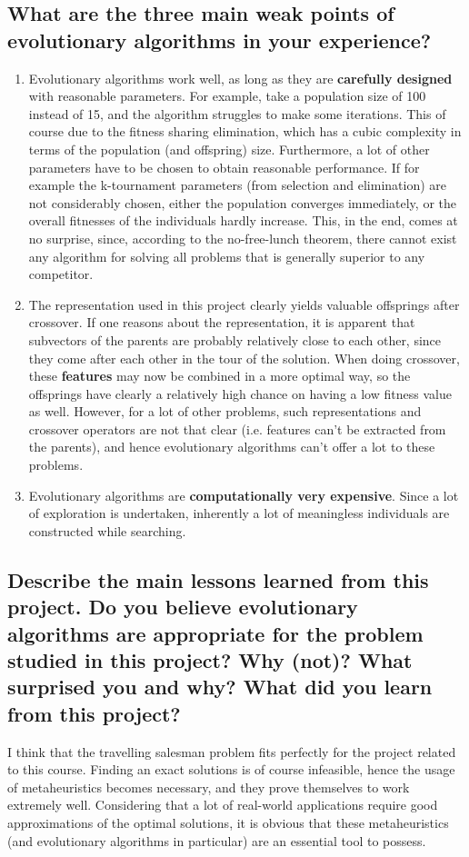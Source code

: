 \documentclass[a4paper,10pt]{article}
\begin{document}
\subsection{What are the three main weak points of evolutionary algorithms in your experience?}

\begin{enumerate}
 \item Evolutionary algorithms work well, as long as they are \textbf{carefully designed} with reasonable parameters. For example, take a population size of 100 instead of 15, and the algorithm struggles to make some iterations. This of course due to the fitness sharing elimination, which has a cubic complexity in terms of the population (and offspring) size. Furthermore, a lot of other parameters have to be chosen to obtain reasonable performance. If for example the k-tournament parameters (from selection and elimination) are not considerably chosen, either the population converges immediately, or the overall fitnesses of the individuals hardly increase. This, in the end, comes at no surprise, since, according to the no-free-lunch theorem, there cannot exist any algorithm for solving all problems that is generally superior to any competitor.
 \item The representation used in this project clearly yields valuable offsprings after crossover. If one reasons about the representation, it is apparent that subvectors of the parents are probably relatively close to each other, since they come after each other in the tour of the solution. When doing crossover, these \textbf{features} may now be combined in a more optimal way, so the offsprings have clearly a relatively high chance on having a low fitness value as well. However, for a lot of other problems, such representations and crossover operators are not that clear (i.e. features can't be extracted from the parents), and hence evolutionary algorithms can't offer a lot to these problems. 
 \item Evolutionary algorithms are \textbf{computationally very expensive}. Since a lot of exploration is undertaken, inherently a lot of meaningless individuals are constructed while searching.
\end{enumerate}

\subsection{Describe the main lessons learned from this project. Do you believe evolutionary algorithms are appropriate for the problem studied in this project? Why (not)? What surprised you and why? What did you learn from this project?}
I think that the travelling salesman problem fits perfectly for the project related to this course. Finding an exact solutions is of course infeasible, hence the usage of metaheuristics becomes necessary, and they prove themselves to work extremely well. Considering that a lot of real-world applications require good approximations of the optimal solutions, it is obvious that these metaheuristics (and evolutionary algorithms in particular) are an essential tool to possess.
\end{document}
